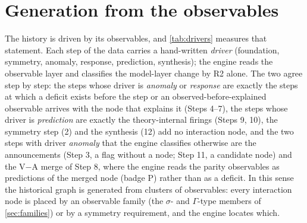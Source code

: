 \documentclass[11pt,a4paper,twoside,openany]{report}
\theoremstyle{plain}
\theoremstyle{definition}
\theoremstyle{remark}
\begin{document}
\section{Generation from the observables}
\begin{table}[htbp]\centering\footnotesize
\caption{The recorded driver of each step against the engine's reading of the observable layer: whether an unexplained observable exists before the step, and the form of R2 detected (anomaly: a deficit or a same-step observed-before-explained observable is reached by the new model node; theory-internal: no such observable; announced: a candidate node; flagged: a new deficit and no model node).}\label{tab:drivers}

\end{table}
The history is driven by its observables, and \cref{tab:drivers} measures that statement. Each step of the data carries a hand-written \emph{driver} (foundation, symmetry, anomaly, response, prediction, synthesis); the engine reads the observable layer and classifies the model-layer change by R2 alone. The two agree step by step: the steps whose driver is \emph{anomaly} or \emph{response} are exactly the steps at which a deficit exists before the step or an observed-before-explained observable arrives with the node that explains it (Steps 4--7), the steps whose driver is \emph{prediction} are exactly the theory-internal firings (Steps 9, 10), the symmetry step (2) and the synthesis (12) add no interaction node, and the two steps with driver \emph{anomaly} that the engine classifies otherwise are the announcements (Step 3, a flag without a node; Step 11, a candidate node) and the V$-$A merge of Step 8, where the engine reads the parity observables as predictions of the merged node (badge P) rather than as a deficit. In this sense the historical graph is generated from clusters of observables: every interaction node is placed by an observable family (the $\sigma$- and $\Gamma$-type members of \cref{sec:families}) or by a symmetry requirement, and the engine locates which.
\end{document}
